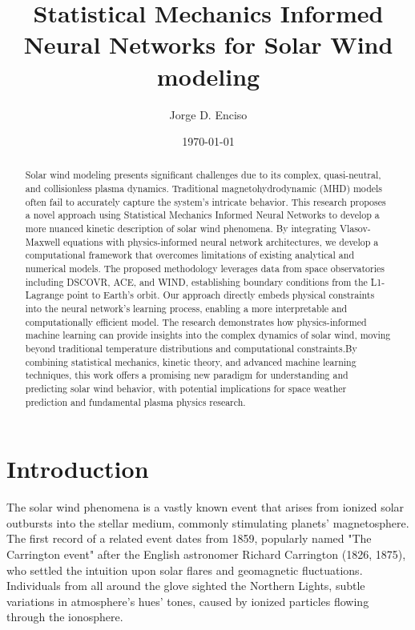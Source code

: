 \documentclass[12pt]{article}
\title{Statistical Mechanics Informed Neural Networks for Solar Wind modeling}
\author{Jorge D. Enciso}
\date{\today}
\begin{document}
\maketitle

\begin{abstract}
    Solar wind modeling presents significant challenges due to its complex, quasi-neutral, and collisionless plasma dynamics. Traditional magnetohydrodynamic (MHD) models often fail to accurately capture the system's intricate behavior. This research proposes a novel approach using Statistical Mechanics Informed Neural Networks to develop a more nuanced kinetic description of solar wind phenomena. By integrating Vlasov-Maxwell equations with physics-informed neural network architectures, we develop a computational framework that overcomes limitations of existing analytical and numerical models. The proposed methodology leverages data from space observatories including DSCOVR, ACE, and WIND, establishing boundary conditions from the L1-Lagrange point to Earth's orbit. Our approach directly embeds physical constraints into the neural network's learning process, enabling a more interpretable and computationally efficient model. The research demonstrates how physics-informed machine learning can provide insights into the complex dynamics of solar wind, moving beyond traditional temperature distributions and computational constraints.By combining statistical mechanics, kinetic theory, and advanced machine learning techniques, this work offers a promising new paradigm for understanding and predicting solar wind behavior, with potential implications for space weather prediction and fundamental plasma physics research.
\end{abstract}

\tableofcontents
\newpage

\section{Introduction}

The solar wind phenomena is a vastly known event that arises from ionized solar outbursts into the stellar medium, commonly stimulating planets' magnetosphere. \cite{Gosling2007} The first record of a related event dates from 1859, popularly named "The Carrington event" after the English astronomer Richard Carrington (1826, 1875), who settled the intuition upon solar flares and geomagnetic fluctuations. Individuals from all around the glove sighted the Northern Lights, subtle variations in atmosphere's hues' tones, caused by ionized particles flowing through the ionosphere.
\end{document}
